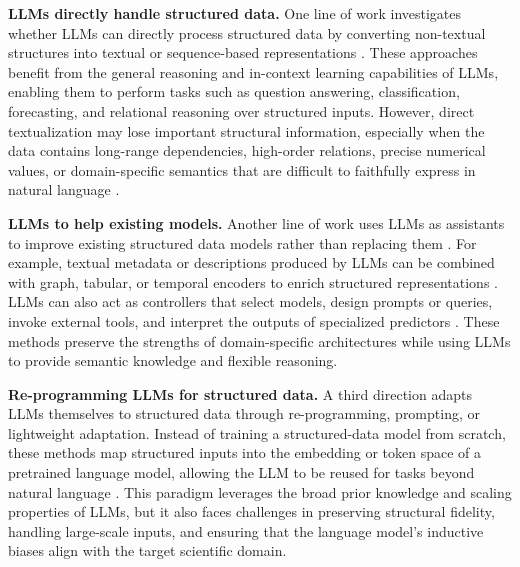 \textbf{LLMs directly handle structured data.}
One line of work investigates whether LLMs can directly process structured data by converting non-textual structures into textual or sequence-based representations \cite{DBLP:conf/sigir/Tang00SSCY024, DBLP:journals/corr/abs-2506-11040, DBLP:journals/corr/abs-2601-23204, DBLP:journals/corr/abs-2407-12522, DBLP:conf/emnlp/JiangZDYZW23}. These approaches benefit from the general reasoning and in-context learning capabilities of LLMs, enabling them to perform tasks such as question answering, classification, forecasting, and relational reasoning over structured inputs. However, direct textualization may lose important structural information, especially when the data contains long-range dependencies, high-order relations, precise numerical values, or domain-specific semantics that are difficult to faithfully express in natural language \cite{DBLP:conf/wsdm/SuiZZH024, DBLP:journals/corr/abs-2507-13646, DBLP:journals/bmcbi/SadeghiBFLN24, DBLP:journals/corr/abs-2510-01538, DBLP:conf/emnlp/YangTXZLH25}.

\textbf{LLMs to help existing models.}
Another line of work uses LLMs as assistants to improve existing structured data models rather than replacing them \cite{DBLP:journals/tkde/JinLHJJH24, DBLP:journals/sigkdd/ChenMLJWWWYFLT23, DBLP:journals/corr/abs-2502-08942}. For example, textual metadata or descriptions produced by LLMs can be combined with graph, tabular, or temporal encoders to enrich structured representations \cite{DBLP:journals/corr/abs-2510-21131, DBLP:conf/nips/YanLLY0ZYZHSDZ023, DBLP:conf/acl/0006ZJFJBH025, DBLP:journals/corr/abs-2509-00687, DBLP:journals/corr/abs-2506-00009}. LLMs can also act as controllers that select models, design prompts or queries, invoke external tools, and interpret the outputs of specialized predictors \cite{DBLP:conf/icml/TriratJH25, DBLP:journals/tmlr/TornedeDEGMRSTT24, DBLP:conf/mm/LuoFN024}. These methods preserve the strengths of domain-specific architectures while using LLMs to provide semantic knowledge and flexible reasoning.

\textbf{Re-programming LLMs for structured data.}
A third direction adapts LLMs themselves to structured data through re-programming, prompting, or lightweight adaptation. Instead of training a structured-data model from scratch, these methods map structured inputs into the embedding or token space of a pretrained language model, allowing the LLM to be reused for tasks beyond natural language \cite{DBLP:conf/iclr/0005WMCZSCLLPW24, DBLP:journals/corr/abs-2402-05862, DBLP:journals/corr/abs-2502-13449, DBLP:journals/corr/abs-2409-03444}. 
This paradigm leverages the broad prior knowledge and scaling properties of LLMs, but it also faces challenges in preserving structural fidelity, handling large-scale inputs, and ensuring that the language model's inductive biases align with the target scientific domain.

